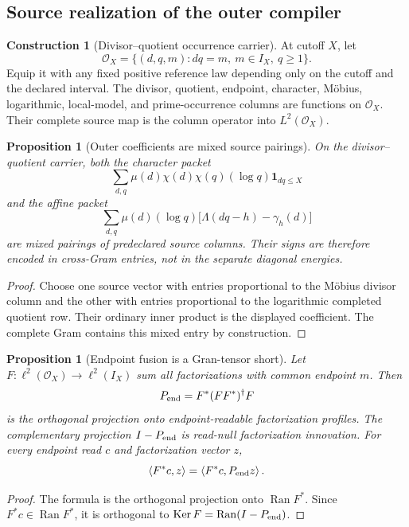 \documentclass[11pt]{article}
\newtheorem{proposition}[theorem]{Proposition}
\theoremstyle{definition}
\newtheorem{construction}[theorem]{Construction}
\theoremstyle{remark}
\newcommand{\one}{\mathbf 1}
\newcommand{\Ker}{\operatorname{Ker}}
\newcommand{\Ran}{\operatorname{Ran}}
\newcommand{\ip}[2]{\left\langle#1,#2\right\rangle}
\begin{document}
\subsection{Source realization of the outer compiler}

\begin{construction}[Divisor--quotient occurrence carrier]
At cutoff $X$, let
\[
 \mathcal O_X=
 \{(d,q,m):dq=m,\ m\in I_X,\ q\ge1\}.
\]
Equip it with any fixed positive reference law depending only on the cutoff
and the declared interval.  The divisor, quotient, endpoint, character,
M\"obius, logarithmic, local-model, and prime-occurrence columns are functions
on $\mathcal O_X$.  Their complete source map is the column operator into
$L^2(\mathcal O_X)$.
\end{construction}

\begin{proposition}[Outer coefficients are mixed source pairings]
On the divisor--quotient carrier, both the character packet
\[
 \sum_{d,q}\mu(d)\chi(d)\chi(q)(\log q)\one_{dq\le X}
\]
and the affine packet
\[
 \sum_{d,q}\mu(d)(\log q)
 \bigl[\Lambda(dq-h)-\gamma_h(d)\bigr]
\]
are mixed pairings of predeclared source columns.  Their signs are therefore
encoded in cross-Gram entries, not in the separate diagonal energies.
\end{proposition}

\begin{proof}
Choose one source vector with entries proportional to the M\"obius divisor
column and the other with entries proportional to the logarithmic completed
quotient row.  Their ordinary inner product is the displayed coefficient.
The complete Gram contains this mixed entry by construction.
\end{proof}

\begin{proposition}[Endpoint fusion is a Gran-tensor short]
Let $F:\ell^2(\mathcal O_X)\to\ell^2(I_X)$ sum all factorizations with common
endpoint $m$.  Then
\[
 P_{\rm end}=F^*(FF^*)^\dagger F
\]
is the orthogonal projection onto endpoint-readable factorization profiles.
The complementary projection $I-P_{\rm end}$ is read-null factorization
innovation.  For every endpoint read $c$ and factorization vector $z$,
\[
 \ip{F^*c}{z}=\ip{F^*c}{P_{\rm end}z}.
\]
\end{proposition}

\begin{proof}
The formula is the orthogonal projection onto $\Ran F^*$.  Since
$F^*c\in\Ran F^*$, it is orthogonal to $\Ker F=\Ran(I-P_{\rm end})$.
\end{proof}
\end{document}
